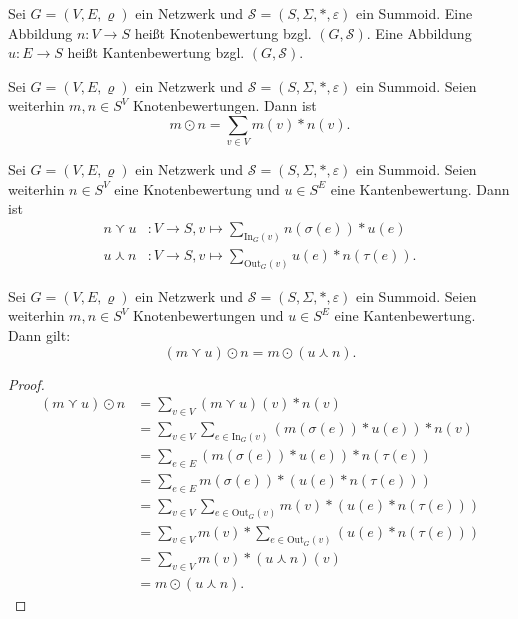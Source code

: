 \documentclass{article}
\begin{document}
\begin{definition}
  Sei $G = (V, E, \varrho)$ ein Netzwerk und
  $\mathcal{S} = (S, \Sigma, \ast, \varepsilon)$ ein Summoid.
  Eine Abbildung $n \colon V \to S$ heißt Knotenbewertung bzgl. $(G, \mathcal{S})$.
  Eine Abbildung $u \colon E \to S$ heißt Kantenbewertung bzgl. $(G, \mathcal{S})$.
\end{definition}

\begin{definition}
  Sei $G = (V, E, \varrho)$ ein Netzwerk und
  $\mathcal{S} = (S, \Sigma, \ast, \varepsilon)$ ein Summoid.
  Seien weiterhin $m, n \in S^V$ Knotenbewertungen.
  Dann ist
  \begin{equation*}
    m \odot n = \sum_{v \in V}m(v) \ast n(v).
   \end{equation*}  
\end{definition}

\begin{definition}
  Sei $G = (V, E, \varrho)$ ein Netzwerk und
  $\mathcal{S} = (S, \Sigma, \ast, \varepsilon)$ ein Summoid.
  Seien weiterhin $n \in S^V$ eine Knotenbewertung
  und $u \in S^E$ eine Kantenbewertung.
  Dann ist
  \begin{align*}
    n \curlyvee u &\colon V \to S, v \mapsto \sum_{\text{In}_G(v)} n(\sigma(e)) \ast u(e) \\
    u \curlywedge n &\colon V \to S, v \mapsto \sum_{\text{Out}_G(v)} u(e) \ast n(\tau(e)).
  \end{align*}
\end{definition}

\begin{theorem}\label{Theorem_KnotenKantenFaltung}
  Sei $G = (V, E, \varrho)$ ein Netzwerk und
  $\mathcal{S} = (S, \Sigma, \ast, \varepsilon)$ ein Summoid.
  Seien weiterhin $m, n \in S^V$ Knotenbewertungen und $u \in S^E$ eine Kantenbewertung.
  Dann gilt:
  \begin{equation*}
    (m \curlyvee u) \odot n = m \odot (u \curlywedge n).
  \end{equation*}
\end{theorem}
\begin{proof}
  \begin{align*}
    (m \curlyvee u) \odot n
    &= \sum_{v \in V}(m \curlyvee u)(v) \ast n(v) \\
    &= \sum_{v \in V}\sum_{e \in \text{In}_G(v)}(m(\sigma(e)) \ast u(e)) \ast n(v) \\
    &= \sum_{e \in E} (m(\sigma(e)) \ast u(e)) \ast n(\tau(e)) \\
    &= \sum_{e \in E} m(\sigma(e)) \ast (u(e) \ast n(\tau(e))) \\
    &= \sum_{v \in V}\sum_{e \in \text{Out}_G(v)} m(v) \ast (u(e) \ast n(\tau(e))) \\
    &= \sum_{v \in V} m(v) \ast \sum_{e \in \text{Out}_G(v)}(u(e) \ast n(\tau(e))) \\
    &= \sum_{v \in V} m(v) \ast (u \curlywedge n)(v) \\
    &= m \odot (u \curlywedge n).
  \end{align*}
\end{proof}
\end{document}
